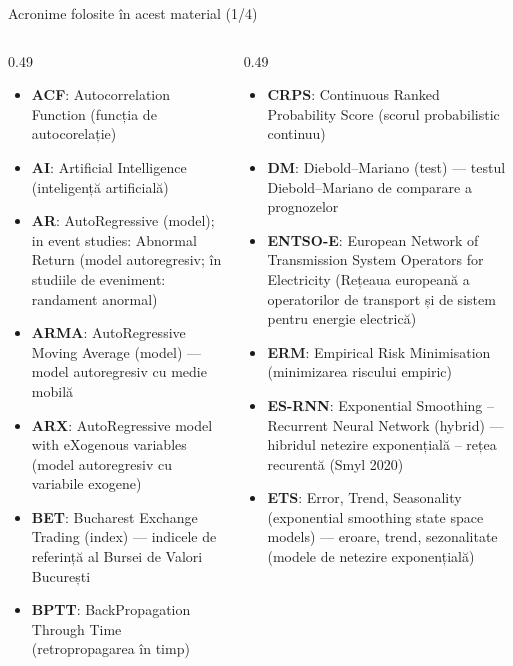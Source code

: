 \begin{frame}{Acronime folosite în acest material (1/4)}
\begin{columns}[T]
\begin{column}{0.49\textwidth}
\begin{itemize}\setlength{\itemsep}{0pt}
    \item \textbf{ACF}: Autocorrelation Function (funcția de autocorelație)
    \item \textbf{AI}: Artificial Intelligence (inteligență artificială)
    \item \textbf{AR}: AutoRegressive (model); in event studies: Abnormal Return (model autoregresiv; în studiile de eveniment: randament anormal)
    \item \textbf{ARMA}: AutoRegressive Moving Average (model) — model autoregresiv cu medie mobilă
    \item \textbf{ARX}: AutoRegressive model with eXogenous variables (model autoregresiv cu variabile exogene)
    \item \textbf{BET}: Bucharest Exchange Trading (index) — indicele de referință al Bursei de Valori București
    \item \textbf{BPTT}: BackPropagation Through Time (retropropagarea în timp)
\end{itemize}
\end{column}
\begin{column}{0.49\textwidth}
\begin{itemize}\setlength{\itemsep}{0pt}
    \item \textbf{CRPS}: Continuous Ranked Probability Score (scorul probabilistic continuu)
    \item \textbf{DM}: Diebold–Mariano (test) — testul Diebold–Mariano de comparare a prognozelor
    \item \textbf{ENTSO-E}: European Network of Transmission System Operators for Electricity (Rețeaua europeană a operatorilor de transport și de sistem pentru energie electrică)
    \item \textbf{ERM}: Empirical Risk Minimisation (minimizarea riscului empiric)
    \item \textbf{ES-RNN}: Exponential Smoothing – Recurrent Neural Network (hybrid) — hibridul netezire exponențială – rețea recurentă (Smyl 2020)
    \item \textbf{ETS}: Error, Trend, Seasonality (exponential smoothing state space models) — eroare, trend, sezonalitate (modele de netezire exponențială)
\end{itemize}
\end{column}
\end{columns}
\end{frame}
